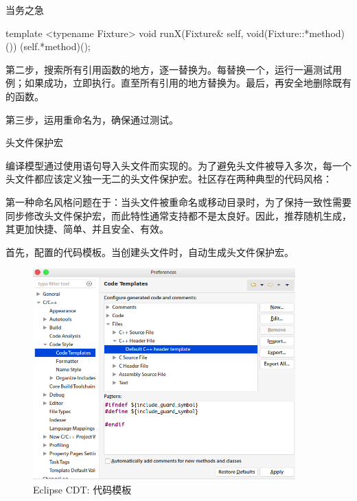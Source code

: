 \begin{content}
\begin{episode}{当务之急}
\begin{content}
\begin{c++}[title={\ttfamily{重构: 搬迁实现}}]
template <typename Fixture>
void runX(Fixture& self, void(Fixture::*method)()) {
  (self.*method)();
}
\end{c++}

第二步，搜索所有引用函数的地方，逐一替换为。每替换一个，运行一遍测试用例；如果成功，立即执行。直至所有引用的地方替换为。最后，再安全地删除既有的函数。

第三步，运用重命名为，确保通过测试。

\end{content}
\end{episode}

\begin{episode}{头文件保护宏}

\begin{content}

编译模型通过使用语句导入头文件而实现的。为了避免头文件被导入多次，每一个头文件都应该定义独一无二的头文件保护宏。社区存在两种典型的代码风格：

\begin{enum}
\end{enum}

第一种命名风格问题在于：当头文件被重命名或移动目录时，为了保持一致性需要同步修改头文件保护宏，而此特性通常支持都不是太良好。因此，推荐随机生成，其更加快捷、简单、并且安全、有效。

首先，配置的代码模板。当创建头文件时，自动生成头文件保护宏。

\begin{figure}[H]
\centering
\includegraphics[width=0.9\textwidth]{figures/xunit/eclipse-code-template.png}
\caption{Eclipse CDT: 代码模板}
 \label{fig:eclipse-code-template}
\end{figure}


\end{content}
\end{episode}
\end{content}
